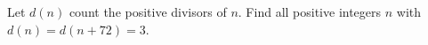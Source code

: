 Let $d(n)$ count the positive divisors of $n$. Find all positive integers $n$ with $d(n)=d(n+72)=3$.
